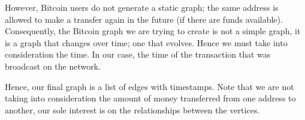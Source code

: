 \documentclass[../../thesis.tex]{subfiles}
\begin{document}
However, Bitcoin users do not generate a static graph; the same address is allowed to make a transfer again in the future (if there are funds available). Consequently, the Bitcoin graph we are trying to create is not a simple graph, it is a graph that changes over time; one that evolves. Hence we must take into consideration the time. In our case, the time of the transaction that was broadcast on the network.

Hence, our final graph is a list of edges with timestamps. Note that we are not taking into consideration the amount of money transferred from one address to another, our sole interest is on the relationships between the vertices. 
\end{document}
